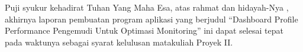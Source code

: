 \begin{acknowledgements}
    Puji syukur kehadirat Tuhan Yang Maha Esa, atas rahmat dan hidayah-Nya , akhirnya laporan pembuatan program aplikasi yang berjudul “Dashboard Profile Performance Pengemudi Untuk Optimasi Monitoring” ini dapat selesai tepat pada waktunya sebagai syarat kelulusan matakuliah Proyek II. 
\end{acknowledgements}